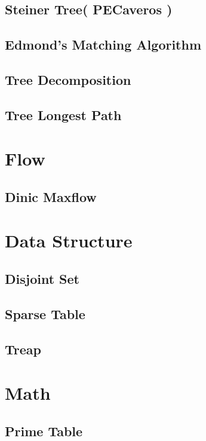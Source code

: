 \documentclass[10pt,twocolumn,oneside]{article}
\begin{document}
\subsection{Steiner Tree( PECaveros )}

\subsection{Edmond's Matching Algorithm}

\subsection{Tree Decomposition}

\subsection{Tree Longest Path}


\section{Flow}
\subsection{Dinic Maxflow}


\section{Data Structure}
\subsection{Disjoint Set}

\subsection{Sparse Table}

\subsection{Treap}


\section{Math}
\subsection{Prime Table}

\end{document}
